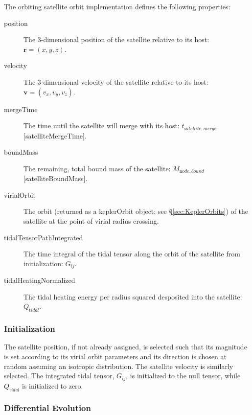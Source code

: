 The orbiting satellite orbit implementation defines the following properties:
\begin{description}
 \item [{\normalfont \ttfamily position}] The 3-dimensional position of the satellite relative to its host: $\mathbf{r}=(x,y,z)$.
 \item [{\normalfont \ttfamily velocity}] The 3-dimensional velocity of the satellite relative to its host: $\mathbf{v}=(v_x,v_y,v_z)$.
 \item [{\normalfont \ttfamily mergeTime}] The time until the satellite will merge with its host: $t_{\mathrm satellite, merge}$ [{\normalfont \ttfamily satelliteMergeTime}].
 \item [{\normalfont \ttfamily boundMass}] The remaining, total bound mass of the satellite: $M_{\mathrm node,bound}$ [{\normalfont \ttfamily satelliteBoundMass}].
 \item[{\normalfont \ttfamily virialOrbit}] The orbit (returned as a {\normalfont \ttfamily keplerOrbit} object; see \S\ref{sec:KeplerOrbits}) of the satellite at the point of virial radius crossing.
 \item[{\normalfont \ttfamily tidalTensorPathIntegrated}] The time integral of the tidal tensor along the orbit of the satellite from initialization: $G_{ij}$.
 \item[{\normalfont \ttfamily tidalHeatingNormalized}] The tidal heating energy per radius squared desposited into the satellite: $Q_{\mathrm tidal}$.
\end{description}

\subsubsection{Initialization}

The satellite position, if not already assigned, is selected such that its magnitude is set according to its virial orbit parameters and its direction is chosen at random assuming an isotropic distribution.  The satellite velocity is similarly selected.  The integrated tidal tensor, $G_{ij}$, is initialized to the null tensor, while $Q_{\mathrm tidal}$ is initialized to zero.

\subsubsection{Differential Evolution}

